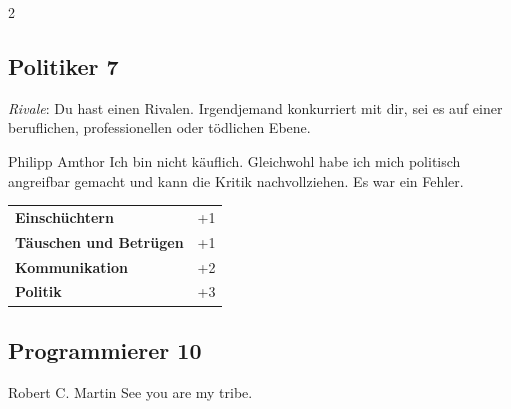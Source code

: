 \begin{multicols}{2}
\begin{tcolorbox}

\end{tcolorbox}

\begin{tcolorbox}
    \subsection*{Politiker \hfill \small{7 }}
    \tcblower
\textit{Rivale}: Du hast einen Rivalen. Irgendjemand konkurriert mit dir, sei es auf einer beruflichen, professionellen oder tödlichen Ebene.

\begin{pquote}{Philipp Amthor}
Ich bin nicht käuflich. Gleichwohl habe ich mich politisch angreifbar gemacht und kann die Kritik nachvollziehen. Es war ein Fehler.
\end{pquote}

\vspace{3mm}

\begin{tabular}{@{}ll@{}}
    \textbf{Einschüchtern} & +1\\
    \textbf{Täuschen und Betrügen} & +1\\
    \textbf{Kommunikation} & +2\\
    \textbf{Politik} & +3\\
\end{tabular}


\end{tcolorbox}

\begin{tcolorbox}
    \subsection*{Programmierer \hfill \small{10 }}
    \tcblower


\begin{pquote}{Robert C. Martin}
See you are my tribe.


\end{pquote}
\end{tcolorbox}
\end{multicols}
